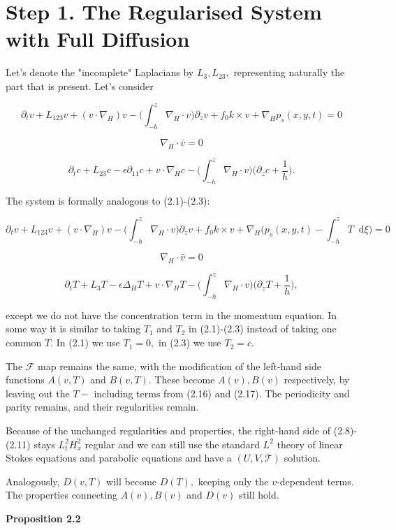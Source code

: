 \documentclass[11pt]{article}
\newcommand*\diff{\mathop{}\!\mathrm{d}}
\begin{document}
\section{Step 1. The Regularised System with Full Diffusion}

Let's denote the "incomplete" Laplacians by $L_3, L_{23},$ representing naturally the part that is present. Let's consider

$$ \partial_t v + L_{123} v + (v \cdot \nabla_H) v - \bigg ( \int_{-h}^z \nabla_H \cdot v \bigg ) \partial_z v+ f_0 k \times v + \nabla_H p_s(x,y,t) = 0$$

$$ \nabla_H \cdot \bar{v} = 0 $$

$$ \partial_t c + L_{23} c - \epsilon \partial_{11} c + v \cdot \nabla_H c - \bigg ( \int_{-h}^z \nabla_H \cdot v \bigg ) \bigg ( \partial_z c + \frac{1}{h} \bigg).$$

The system is formally analogous to (2.1)-(2.3):

$$ \partial_t v + L_{123} v + (v \cdot \nabla_H) v - \bigg ( \int_{-h}^z \nabla_H \cdot v \bigg ) \partial_z v+ f_0 k \times v + \nabla_H \bigg ( p_s(x,y,t) -  \int_{-h}^z T \diff \xi \bigg )= 0$$

$$ \nabla_H \cdot \bar{v} = 0 $$

$$ \partial_t T + L_3 T - \epsilon \Delta_H T + v \cdot \nabla_H T - \bigg ( \int_{-h}^z \nabla_H \cdot v \bigg ) \bigg ( \partial_z T + \frac{1}{h} \bigg),$$

except we do not have the concentration term in the momentum equation. In some way it is similar to taking $T_1$ and $T_2$ in (2.1)-(2.3) instead of taking one common $T.$ In (2.1) we use $T_1 = 0,$ in (2.3) we use $T_2=c.$

The $\mathcal{F}$ map remains the same, with the modification of the left-hand side functions $A(v,T)$ and $B(v,T).$ These become $A(v), B(v)$ respectively, by leaving out the $T-$ including terms from (2.16) and (2.17). The periodicity and parity remains, and their regularities remain.

Because of the unchanged regularities and properties, the right-hand side of (2.8)-(2.11) stays $L^2_t H^2_x$ regular and we can still use the standard $L^2$ theory of linear Stokes equations and parabolic equations and have a $(U,V,\mathcal{T})$ solution.

Analogously, $D(v,T)$ will become $D(T),$ keeping only the $v$-dependent terms. The properties connecting $A(v), B(v)$ and $D(v)$ still hold.

\textbf{Proposition 2.2}
\end{document}
